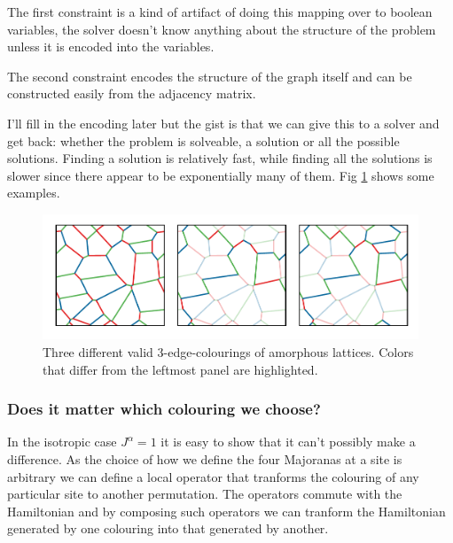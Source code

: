 The first constraint is a kind of artifact of doing this mapping over to
boolean variables, the solver doesn't know anything about the structure
of the problem unless it is encoded into the variables.

The second constraint encodes the structure of the graph itself and can
be constructed easily from the adjacency matrix.

I'll fill in the encoding later but the gist is that we can give this to
a solver and get back: whether the problem is solveable, a solution or
all the possible solutions. Finding a solution is relatively fast, while
finding all the solutions is slower since there appear to be
exponentially many of them. Fig \ref{fig:multiple_colourings} shows some
examples.

\begin{figure}
\hypertarget{fig:multiple_colourings}{%
\centering
\includegraphics[width=1\textwidth,height=\textheight]{figure_code/amk_chapter/multiple_colourings/multiple_colourings.pdf}
\caption{Three different valid 3-edge-colourings of amorphous lattices.
Colors that differ from the leftmost panel are
highlighted.}\label{fig:multiple_colourings}
}
\end{figure}

\hypertarget{does-it-matter-which-colouring-we-choose}{%
\subsubsection{Does it matter which colouring we
choose?}\label{does-it-matter-which-colouring-we-choose}}

In the isotropic case \(J^\alpha = 1\) it is easy to show that it can't
possibly make a difference. As the choice of how we define the four
Majoranas at a site is arbitrary we can define a local operator that
tranforms the colouring of any particular site to another permutation.
The operators commute with the Hamiltonian and by composing such
operators we can tranform the Hamiltonian generated by one colouring
into that generated by another.

